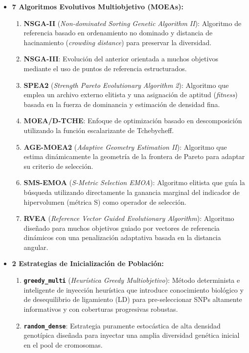 \documentclass[a4paper,10pt]{article}
\begin{document}
\begin{itemize}
    \item \textbf{7 Algoritmos Evolutivos Multiobjetivo (MOEAs):}
    \begin{enumerate}
        \item \textbf{NSGA-II} (\textit{Non-dominated Sorting Genetic Algorithm II}): Algoritmo de referencia basado en ordenamiento no dominado y distancia de hacinamiento (\textit{crowding distance}) para preservar la diversidad.
        \item \textbf{NSGA-III}: Evolución del anterior orientada a muchos objetivos mediante el uso de puntos de referencia estructurados.
        \item \textbf{SPEA2} (\textit{Strength Pareto Evolutionary Algorithm 2}): Algoritmo que emplea un archivo externo elitista y una asignación de aptitud (\textit{fitness}) basada en la fuerza de dominancia y estimación de densidad fina.
        \item \textbf{MOEA/D-TCHE}: Enfoque de optimización basado en descomposición utilizando la función escalarizante de Tchebycheff.
        \item \textbf{AGE-MOEA2} (\textit{Adaptive Geometry Estimation II}): Algoritmo que estima dinámicamente la geometría de la frontera de Pareto para adaptar su criterio de selección.
        \item \textbf{SMS-EMOA} (\textit{S-Metric Selection EMOA}): Algoritmo elitista que guía la búsqueda utilizando directamente la ganancia marginal del indicador de hipervolumen (métrica S) como operador de selección.
        \item \textbf{RVEA} (\textit{Reference Vector Guided Evolutionary Algorithm}): Algoritmo diseñado para muchos objetivos guiado por vectores de referencia dinámicos con una penalización adaptativa basada en la distancia angular.
    \end{enumerate}

    \item \textbf{2 Estrategias de Inicialización de Población:}
    \begin{enumerate}
        \item \textbf{\texttt{greedy\_multi}} (\textit{Heurística Greedy Multiobjetivo}): Método determinista e inteligente de inyección heurística que introduce conocimiento biológico y de desequilibrio de ligamiento (LD) para pre-seleccionar SNPs altamente informativos y con coberturas progresivas robustas.
        \item \textbf{\texttt{random\_dense}}: Estrategia puramente estocástica de alta densidad genotípica diseñada para inyectar una amplia diversidad genética inicial en el pool de cromosomas.
    \end{enumerate}


\end{itemize}
\end{document}
